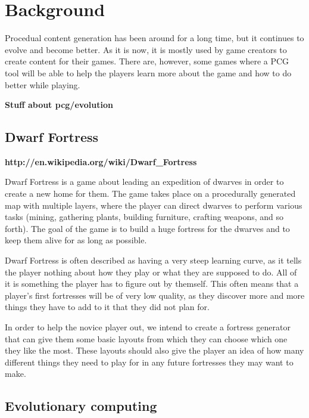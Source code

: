 \section{Background}
\label{02}

Procedual content generation has been around for a long time, but it continues to evolve and become better. As it is now, it is mostly used by game creators to create content for their games. There are, however, some games where a PCG tool will be able to help the players learn more about the game and how to do better while playing.

\textbf{Stuff about pcg/evolution}

\subsection{Dwarf Fortress}

\textbf{http://en.wikipedia.org/wiki/Dwarf\_Fortress}

Dwarf Fortress is a game about leading an expedition of dwarves in order to create a new home for them. The game takes place on a procedurally generated map with multiple layers, where the player can direct dwarves to perform various tasks (mining, gathering plants, building furniture, crafting weapons, and so forth). The goal of the game is to build a huge fortress for the dwarves and to keep them alive for as long as possible.

Dwarf Fortress is often described as having a very steep learning curve, as it tells the player nothing about how they play or what they are supposed to do. All of it is something the player has to figure out by themself. This often means that a player's first fortresses will be of very low quality, as they discover more and more things they have to add to it that they did not plan for.

In order to help the novice player out, we intend to create a fortress generator that can give them some basic layouts from which they can choose which one they like the most. These layouts should also give the player an idea of how many different things they need to play for in any future fortresses they may want to make.


\subsection{Evolutionary computing}
\label{02_Evolution}

